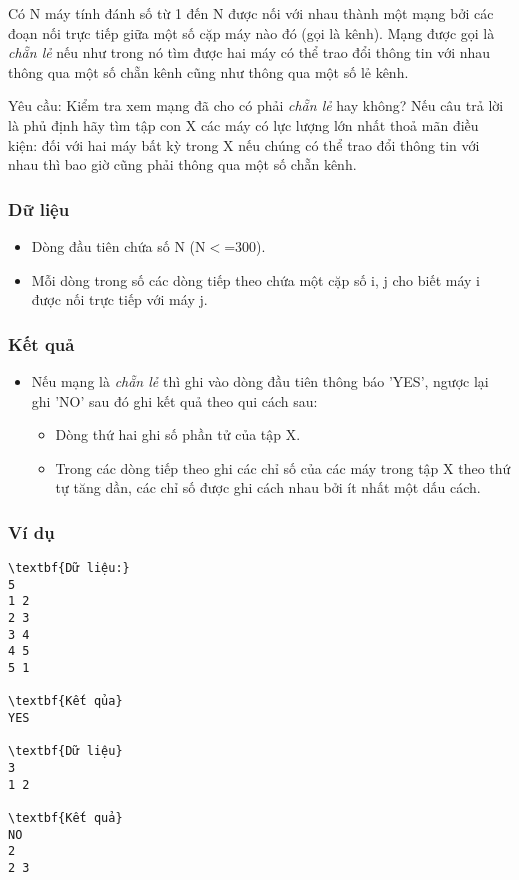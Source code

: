 



   Có N máy tính đánh số từ 1 đến N được nối với nhau thành một mạng bởi các đoạn nối trực tiếp giữa một số cặp máy nào đó (gọi là kênh). Mạng   được gọi là   \emph{    chẵn lẻ   }   nếu như trong nó tìm được hai máy có thể trao đổi thông tin với nhau thông qua một số chẵn kênh cũng như thông qua một   số lẻ kênh.  

   Yêu cầu: Kiểm tra xem mạng đã cho có phải   \emph{    chẵn lẻ   }   hay không? Nếu câu trả lời là phủ định hãy tìm tập con X các máy có lực lượng lớn   nhất thoả mãn điều kiện: đối với hai máy bất kỳ trong X nếu chúng có thể trao đổi thông tin với nhau thì bao giờ cũng phải thông qua một số chẵn kênh.  

\subsubsection{   Dữ liệu  }
\begin{itemize}
	\item     Dòng đầu tiên chứa số N (N$<$=300).   
	\item     Mỗi dòng trong số các dòng tiếp theo chứa một cặp số i, j cho biết máy i được nối trực tiếp với máy j.   
\end{itemize}

\subsubsection{   Kết quả  }
\begin{itemize}
	\item     Nếu mạng là    \emph{     chẵn lẻ    }    thì ghi vào dòng đầu tiên thông báo 'YES', ngược lại ghi 'NO' sau đó ghi kết quả theo qui cách sau:    
\begin{itemize}
	\item       Dòng thứ hai ghi số phần tử của tập X.     
	\item       Trong các dòng tiếp theo ghi các chỉ số của các máy trong tập X theo thứ tự tăng dần, các chỉ số được ghi cách nhau bởi ít nhất một dấu cách.     
\end{itemize}
\end{itemize}

\subsubsection{   Ví dụ  }
\begin{verbatim}
\textbf{Dữ liệu:}
5
1 2
2 3
3 4
4 5
5 1

\textbf{Kết qủa}
YES

\textbf{Dữ liệu}
3 
1 2

\textbf{Kết quả}
NO
2
2 3
\end{verbatim}
